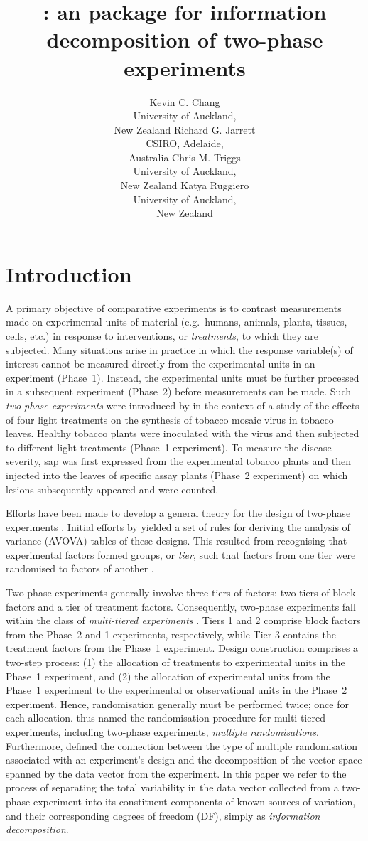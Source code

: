 \documentclass[article]{jss}
\author{Kevin C. Chang\\University of Auckland,\\ New Zealand \And
        Richard G. Jarrett\\CSIRO, Adelaide,\\ Australia \And
        Chris M. Triggs\\University of Auckland,\\ New Zealand \And
        Katya Ruggiero\\University of Auckland,\\ New Zealand }
\title{\pkg{InfoDecompuTE}: an \proglang{R} package for information decomposition of two-phase experiments }
\begin{document}
\section[Introduction]{Introduction}
A primary objective of comparative experiments is to contrast measurements made on experimental units of material (e.g.\ humans, animals, plants, tissues, cells, etc.) in response to interventions, or \emph{treatments}, to which they are subjected. Many situations arise in practice in which the response variable(s) of interest cannot be measured directly from the experimental units in an experiment (Phase~1). Instead, the experimental units must be further processed in a subsequent experiment (Phase~2) before measurements can be made. Such \emph{two-phase experiments} were introduced by \cite{McIntyre1955} in the context of a study of the effects of four light treatments on the synthesis of tobacco mosaic virus in tobacco leaves. Healthy tobacco plants were inoculated with the virus and then subjected to different light treatments (Phase~1 experiment). To measure the disease severity, sap was first expressed from the experimental tobacco plants and then injected into the leaves of specific assay plants (Phase~2 experiment) on which lesions subsequently appeared and were counted. 

Efforts have been made to develop a general theory for the design of two-phase experiments \citep{Brien1983, Wood1988, Brien1999, Jarrett2008}. Initial efforts by \cite{Brien1983} yielded a set of rules for deriving the analysis of variance (AVOVA) tables of these designs. This resulted from recognising that experimental factors formed groups, or \emph{tier}, such that factors from one tier were randomised to factors of another  \cite{Brien1983}.
 
Two-phase experiments generally involve three tiers of factors: two tiers of block factors and a tier of treatment factors. Consequently, two-phase experiments fall within the class of \emph{multi-tiered experiments} \cite{Brien1983}. Tiers 1 and 2 comprise block factors from the Phase~2 and 1 experiments, respectively, while Tier 3 contains the treatment factors from the Phase~1 experiment. Design construction comprises a two-step process: (1) the allocation of treatments to experimental units in the Phase~1 experiment, and (2) the allocation of experimental units from the Phase~1 experiment to the experimental or observational units in the Phase~2 experiment. Hence, randomisation generally must be performed twice; once for each allocation. \cite{Brien2006b} thus named the randomisation procedure for multi-tiered experiments, including two-phase experiments, \emph{multiple randomisations}. Furthermore, \cite{Brien2009, Brien2010} defined the connection between the type of multiple randomisation associated with an experiment's design and the decomposition of the vector space spanned by the data vector from the experiment. In this paper we refer to the process of separating the total variability in the data vector collected from a two-phase experiment into its constituent components of known sources of variation, and their corresponding degrees of freedom (DF), simply as \emph{information decomposition}.
\end{document}
